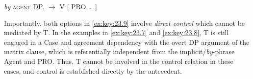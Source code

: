 \documentclass[output=paper]{langsci/langscibook}
\begin{document}
\ea%
    \label{ex:key:23.9}\emph{by} \textsc{agent} DP.\Acc{} $\to$ \Nom{} V [\tss{\Inf} PRO \dots{} ]
    \ea
    \ex
    \z
\z
%
Importantly, both options in \eqref{ex:key:23.9} involve \emph{direct control}
which cannot be mediated by T. In the examples in \eqref{ex:key:23.7} and
\eqref{ex:key:23.8}, T is still engaged in a Case and agreement dependency with
the overt DP argument of the matrix clause, which is referentially independent
from the implicit/\emph{by}-phrase Agent and PRO. Thus, T cannot be involved in
the control relation in these cases, and control is established directly by the
antecedent.\largerpage[1]
\end{document}
